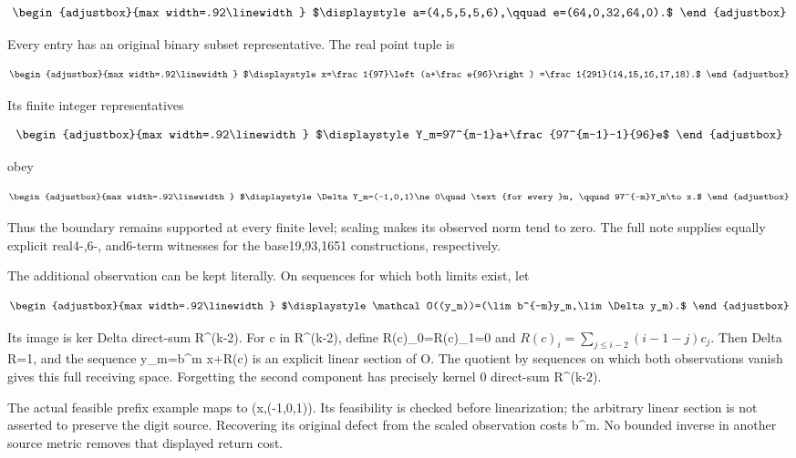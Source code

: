 \[
\begin{adjustbox}{max width=.92\linewidth}
$\displaystyle a=(4,5,5,5,6),\qquad e=(64,0,32,64,0).$
\end{adjustbox}
\]

Every entry has an original binary subset representative. The real point tuple is

\[
\begin{adjustbox}{max width=.92\linewidth}
$\displaystyle x=\frac1{97}\left(a+\frac e{96}\right)
=\frac1{291}(14,15,16,17,18).$
\end{adjustbox}
\]

Its finite integer representatives

\[
\begin{adjustbox}{max width=.92\linewidth}
$\displaystyle Y_m=97^{m-1}a+\frac{97^{m-1}-1}{96}e$
\end{adjustbox}
\]

obey

\[
\begin{adjustbox}{max width=.92\linewidth}
$\displaystyle \Delta Y_m=(-1,0,1)\ne0\quad\text{for every }m,
\qquad97^{-m}Y_m\to x.$
\end{adjustbox}
\]

Thus the boundary remains supported at every finite level; scaling makes its observed norm tend to zero. The full note supplies equally explicit real4-,6-, and6-term witnesses for the base19,93,1651 constructions, respectively.

The additional observation can be kept literally. On sequences for which both limits exist, let

\[
\begin{adjustbox}{max width=.92\linewidth}
$\displaystyle \mathcal O((y_m))=(\lim b^{-m}y_m,\lim\Delta y_m).$
\end{adjustbox}
\]

Its image is ker Delta direct-sum R\^{}(k-2). For c in R\^{}(k-2), define R(c)\_0=R(c)\_1=0 and \(R(c)_i=\sum_{j\le i-2}(i-1-j)c_j\). Then Delta R=1, and the sequence y\_m=b\^{}m x+R(c) is an explicit linear section of O. The quotient by sequences on which both observations vanish gives this full receiving space. Forgetting the second component has precisely kernel 0 direct-sum R\^{}(k-2).

The actual feasible prefix example maps to (x,(-1,0,1)). Its feasibility is checked before linearization; the arbitrary linear section is not asserted to preserve the digit source. Recovering its original defect from the scaled observation costs b\^{}m. No bounded inverse in another source metric removes that displayed return cost.

